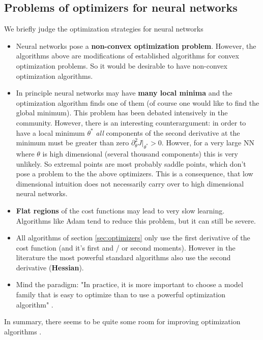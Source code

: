 \documentclass[12pt,a4paper]{article}
\begin{document}
\subsection{Problems of optimizers for neural networks}
We briefly judge the optimization strategies for neural networks
\begin{itemize}\setlength\itemsep{0em}
	\item Neural networks pose a \textbf{non-convex optimization problem}. However, the algorithms above are modifications of established algorithms for convex optimization problems. So it would be desirable to have non-convex optimization algorithms.
	\item In principle neural networks may have \textbf{many local minima} and the optimization algorithm finds one of them (of course one would like to find the global minimum). This problem has been debated intensively in the community. However, there is an interesting counterargument: in order to have a local minimum $\theta^*$ \textit{all} components of the second derivative at the minimum must be greater than zero $\partial_\theta ^2 J \rvert _{\theta^*} > 0$. Howver, for a very large NN where $\theta$ is high dimensional (several thousand components) this is very unlikely. So extremal points are most probably saddle points, which don't pose a problem to the the above optimizers. This is a consequence, that low dimensional intuition does not necessarily carry over to high dimensional neural networks.
	\item \textbf{Flat regions} of the cost functions may lead to very slow learning. Algorithms like Adam tend to reduce this problem, but it can still be severe.
	\item All algorithms of section  \ref{sec:optimizers} only use the first derivative of the cost function (and it's first and / or second moments). However in the literature the most powerful standard algorithms also use the second derivative (\textbf{Hessian}).
	\item Mind the paradigm: "In practice, it is more important to choose a model family that is easy to optimize than to use a powerful optimization algorithm" \cite{Goodfellow:2016:DL}. 
\end{itemize}
In summary, there seems to be quite some room for improving optimization algorithms \cite{2017arXiv170807827X}. 
\end{document}
